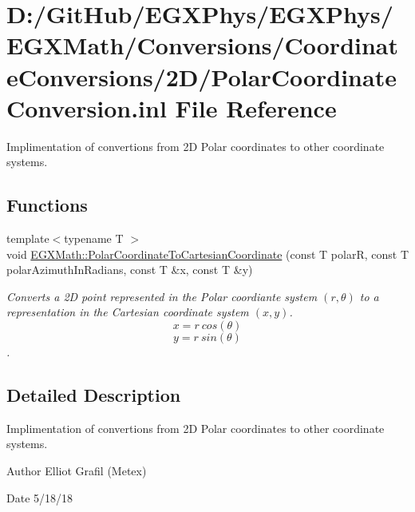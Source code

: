 \hypertarget{_polar_coordinate_conversion_8inl}{}\section{D\+:/\+Git\+Hub/\+E\+G\+X\+Phys/\+E\+G\+X\+Phys/\+E\+G\+X\+Math/\+Conversions/\+Coordinate\+Conversions/2\+D/\+Polar\+Coordinate\+Conversion.inl File Reference}
\label{_polar_coordinate_conversion_8inl}


Implimentation of convertions from 2D Polar coordinates to other coordinate systems.  


\subsection*{Functions}
\begin{DoxyCompactItemize}
\item 
{\footnotesize template$<$typename T $>$ }\\void \mbox{\hyperlink{group___e_g_x_math-_conversions-_coordinate_conversions-2_d-_polar_ga189458efd604828d5825a8e8929845eb}{E\+G\+X\+Math\+::\+Polar\+Coordinate\+To\+Cartesian\+Coordinate}} (const T polarR, const T polar\+Azimuth\+In\+Radians, const T \&x, const T \&y)
\begin{DoxyCompactList}\small\item\em Converts a 2D point represented in the Polar coordiante system $(r,\theta)$ to a representation in the Cartesian coordinate system $(x,y)$. \[ x = r\ cos(\theta) \] \[ y = r\ sin(\theta) \]. \end{DoxyCompactList}\end{DoxyCompactItemize}


\subsection{Detailed Description}
Implimentation of convertions from 2D Polar coordinates to other coordinate systems. 

\begin{DoxyAuthor}{Author}
Elliot Grafil (Metex) 
\end{DoxyAuthor}
\begin{DoxyDate}{Date}
5/18/18 
\end{DoxyDate}
